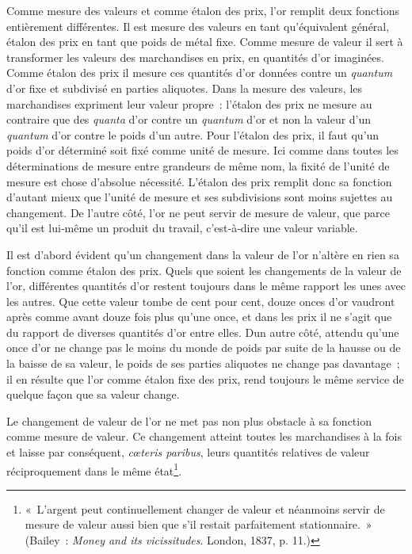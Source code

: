 \documentclass[french,twoside]{book} %
\begin{document}
Comme mesure des valeurs et comme étalon des prix, l’or remplit deux fonctions entièrement différentes. Il est mesure des valeurs en tant qu’équivalent général, étalon des prix en tant que poids de métal fixe. Comme mesure de valeur il sert à transformer les valeurs des marchandises en prix, en quantités d’or imaginées. Comme étalon des prix il mesure ces quantités d’or données contre un \emph{quantum} d’or fixe et subdivisé en parties aliquotes. Dans la mesure des valeurs, les marchandises expriment leur valeur propre : l’étalon des prix ne mesure au contraire que des \emph{quanta} d’or contre un \emph{quantum} d’or et non la valeur d’un \emph{quantum} d’or contre le poids d’un autre. Pour l’étalon des prix, il faut qu’un poids d’or déterminé soit fixé comme unité de mesure. Ici comme dans toutes les déterminations de mesure entre grandeurs de même nom, la fixité de l’unité de mesure est chose d’absolue nécessité. L’étalon des prix remplit donc sa fonction d’autant mieux que l’unité de mesure et ses subdivisions sont moins sujettes au changement. De l’autre côté, l’or ne peut servir de mesure de valeur, que parce qu’il est lui‑même un produit du travail, c’est‑à‑dire une valeur variable.\par
Il est d’abord évident qu’un changement dans la valeur de l’or n’altère en rien sa fonction comme étalon des prix. Quels que soient les changements de la valeur de l’or, différentes quantités d’or restent toujours dans le même rapport les unes avec les autres. Que cette valeur tombe de cent pour cent, douze onces d’or vaudront après comme avant douze fois plus qu’une once, et dans les prix il ne s’agit que du rapport de diverses quantités d’or entre elles. Dun autre côté, attendu qu’une once d’or ne change pas le moins du monde de poids par suite de la hausse ou de la baisse de sa valeur, le poids de ses parties aliquotes ne change pas davantage ; il en résulte que l’or comme étalon fixe des prix, rend toujours le même service de quelque façon que sa valeur change.\par
Le changement de valeur de l’or ne met pas non plus obstacle à sa fonction comme mesure de valeur. Ce changement atteint toutes les marchandises à la fois et laisse par conséquent, \emph{cœteris paribus}, leurs quantités relatives de valeur réciproquement dans le même état\footnote{« L’argent peut continuellement changer de valeur et néanmoins servir de mesure de valeur aussi bien que s’il restait parfaitement stationnaire. » (Bailey : \emph{Money and its vicissitudes}. London, 1837, p. 11.)}.\par
\end{document}
